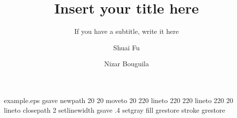 %
%
%
%
%
\begin{filecontents*}{example.eps}
gsave
newpath
  20 20 moveto
  20 220 lineto
  220 220 lineto
  220 20 lineto
closepath
2 setlinewidth
gsave
  .4 setgray fill
grestore
stroke
grestore
\end{filecontents*}
%
\RequirePackage{fix-cm}
%
\documentclass[smallextended]{svjour3}       %
%
\smartqed  %
%
\usepackage{graphicx}
%
%
\usepackage{amsmath}
\usepackage{amssymb}

%
%
%


\title{Insert your title here%
}
\subtitle{If you have a subtitle, write it here}


\author{Shuai Fu         \and
        Nizar Bouguila %
}



